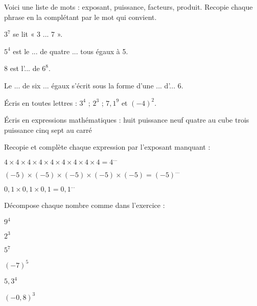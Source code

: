 
\begin{exercice}[]
Voici une liste de mots : exposant, puissance, facteurs, produit. Recopie chaque phrase en la complétant par le mot qui convient.

\begin{colenumerate}{1} 
\item $3^7$ se lit « 3 ... 7 ».
\item $5^4$ est le ... de quatre ... tous égaux à 5.
\item 8 est l'... de $6^8$.
\item Le ... de six ... égaux s'écrit sous la forme d'une ... d'... 6.
\end{colenumerate} 
\end{exercice}

\begin{exercice}

\begin{colenumerate}{1} 
\item Écris en toutes lettres : $3^4$ ; $2^3$ ; $7,1^9$ et $(-4)^2$.
\item Écris en expressions mathématiques :
    \subitem huit puissance neuf 
    \subitem quatre au cube 
    \subitem trois puissance cinq 
    \subitem sept au carré
\end{colenumerate} 
\end{exercice}

\begin{exercice}[]\label{Pex1}
Recopie et complète chaque expression par l'exposant manquant :

\begin{colenumerate}{1} 
\item $4 \times 4 \times 4 \times 4 \times 4 \times 4 \times 4 \times 4 \times 4 = 4^{...}$
\item $(-5) \times (-5) \times (-5) \times (-5) \times (-5) = (-5)^{...}$
\item $0,1 \times 0,1 \times 0,1 = 0,1^{...}$
\end{colenumerate} 
\end{exercice}

\begin{exercice}[]
Décompose chaque nombre comme dans l'exercice  :

\begin{colenumerate}{3} 
\item $9^4$
\item $2^3$
\item $5^7$
\item $(-7)^5$
\item $5,3^4$
\item $(-0,8)^3$ 
\end{colenumerate} 
\end{exercice}



